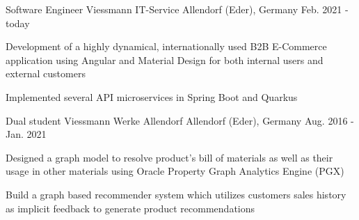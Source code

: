 

\begin{cventries}

  \cventry
    {Software Engineer} %
    {Viessmann IT-Service} %
    {Allendorf (Eder), Germany} %
    {Feb. 2021 - today} %
    {
      \begin{cvitems} %
        \item {Development of a highly dynamical, internationally used B2B E-Commerce application using Angular and Material Design for both internal users and external customers}
        \item {Implemented several API microservices in Spring Boot and Quarkus}
      \end{cvitems}
    }

    \cventry
    {Dual student} %
    {Viessmann Werke Allendorf} %
    {Allendorf (Eder), Germany} %
    {Aug. 2016 - Jan. 2021} %
    {
        \begin{cvitems} %
            \item {Designed a graph model to resolve product's bill of materials as well as their usage in other materials using Oracle Property Graph Analytics Engine (PGX)}
            \item {Build a graph based recommender system which utilizes customers sales history as implicit feedback to generate product recommendations}
        \end{cvitems}
    }

\end{cventries}
